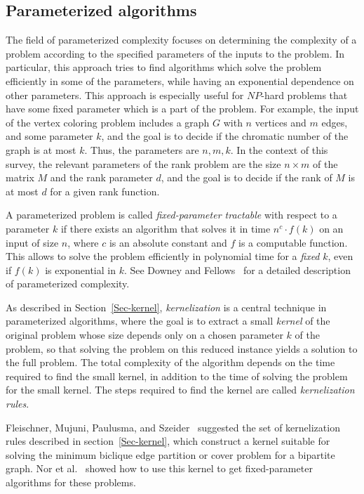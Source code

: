 \documentclass[11pt]{article}
\begin{document}
{{\subsection{Parameterized algorithms}
\label{SubSec-parameter}

The field of parameterized complexity focuses on determining the complexity of a problem according to the specified parameters of the inputs to the problem.
In particular, this approach tries to find  algorithms which  solve the problem efficiently in some of the parameters, while having an exponential dependence on other parameters.
This approach is especially useful for $NP$-hard problems that have some fixed parameter which is a part of the problem.
For example, the input of the vertex coloring problem includes a graph $G$ with $n$ vertices and $m$ edges, and some parameter $k$,
and the goal is to decide if the chromatic number of the graph is at most $k$. Thus, the parameters are $n,m,k$.
In the context of this survey, the relevant parameters of the rank problem are the size $n \times m$ of the matrix $M$ and the rank parameter $d$,
and the goal is to decide if the rank of $M$ is at most $d$ for a given rank function.

A parameterized problem is called {\em fixed-parameter tractable} with respect to a parameter $k$ if there exists an algorithm that solves it
in time $n^c \cdot f(k)$ on an input of size $n$, where $c$ is an absolute constant and $f$ is a computable function.
This allows to solve the problem efficiently in polynomial time for a {\em fixed} $k$, even if $f(k)$ is exponential in $k$.
See Downey and Fellows~\cite{downey1995fixed} for a detailed description of parameterized complexity.

As described in Section~\ref{Sec-kernel}, {\em kernelization} is a central technique in parameterized algorithms,
where the goal is to extract a small {\em kernel} of the original problem whose size depends only on a chosen parameter $k$ of the problem,
so that solving the problem on this reduced instance yields a solution to the full problem.
The total complexity of the algorithm depends on the time required to find the small kernel, in addition to the time of solving the problem for the small kernel.
The steps required to find the kernel are called {\em kernelization rules}.

Fleischner,  Mujuni, Paulusma, and Szeider~\cite{fleischner2009covering} suggested the set of kernelization rules described in section~\ref{Sec-kernel},
which construct a kernel suitable for solving the minimum biclique edge partition or cover problem for a bipartite graph.
Nor et al.~\cite{nor2012mod} showed how to use this kernel to get fixed-parameter algorithms for these problems.

}}
\end{document}
